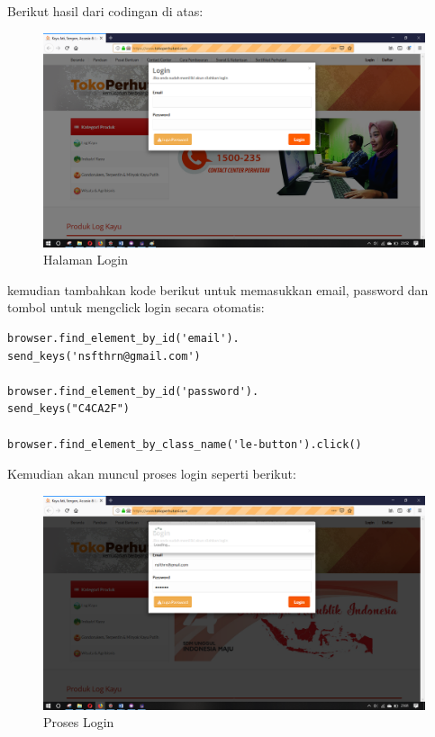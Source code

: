 Berikut hasil dari codingan di atas:
\begin{figure}[h]
	\centering
	\includegraphics[scale=0.20]{figures/0login}
	\caption{Halaman Login}
\end{figure}

kemudian tambahkan kode berikut untuk memasukkan email, password dan tombol untuk mengclick login secara otomatis: 
\begin{verbatim}
browser.find_element_by_id('email').
send_keys('nsfthrn@gmail.com')

browser.find_element_by_id('password').
send_keys("C4CA2F")

browser.find_element_by_class_name('le-button').click() 
\end{verbatim}
\newpage
Kemudian akan muncul proses login seperti berikut:
\begin{figure}[h]
	\centering
	\includegraphics[scale=0.21]{figures/1login}
	\caption{Proses Login}
\end{figure}

